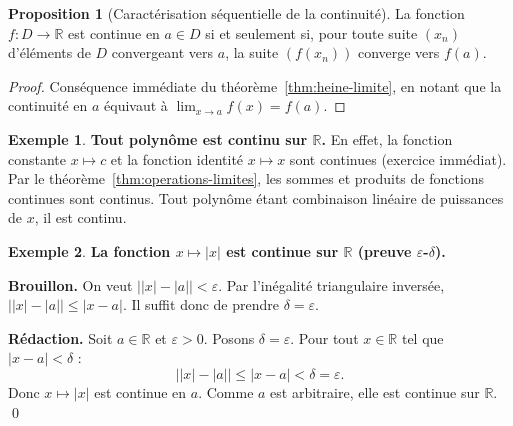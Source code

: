 \documentclass[12pt,a4paper,openany]{book}
\theoremstyle{definition}
\newtheorem{proposition}{Proposition}[chapter]
\newtheorem{exemple}{Exemple}[chapter]
\newcommand{\R}{\mathbb{R}}
\begin{document}
\begin{proposition}[Caractérisation séquentielle de la continuité]\label{prop:continuite-sequentielle}
La fonction $f \colon D \to \R$ est continue en $a \in D$ si et seulement si, pour toute suite $(x_n)$ d'éléments de $D$ convergeant vers $a$, la suite $(f(x_n))$ converge vers $f(a)$.
\end{proposition}

\begin{proof}
Conséquence immédiate du théorème~\ref{thm:heine-limite}, en notant que la continuité en $a$ équivaut à $\lim_{x \to a} f(x) = f(a)$.
\end{proof}

\begin{exemple}\label{ex:polynome-continu}
\textbf{Tout polynôme est continu sur $\R$.} En effet, la fonction constante $x \mapsto c$ et la fonction identité $x \mapsto x$ sont continues (exercice immédiat). Par le théorème~\ref{thm:operations-limites}, les sommes et produits de fonctions continues sont continus. Tout polynôme étant combinaison linéaire de puissances de $x$, il est continu.
\end{exemple}

\begin{exemple}\label{ex:valeur-absolue-continue}
\textbf{La fonction $x \mapsto |x|$ est continue sur $\R$ (preuve $\varepsilon$-$\delta$).}

\medskip
\textbf{Brouillon.} On veut $\bigl||x| - |a|\bigr| < \varepsilon$. Par l'inégalité triangulaire inversée, $\bigl||x| - |a|\bigr| \leqslant |x - a|$. Il suffit donc de prendre $\delta = \varepsilon$.

\medskip
\textbf{Rédaction.} Soit $a \in \R$ et $\varepsilon > 0$. Posons $\delta = \varepsilon$. Pour tout $x \in \R$ tel que $|x - a| < \delta$ :
\[
  \bigl||x| - |a|\bigr| \leqslant |x - a| < \delta = \varepsilon.
\]
Donc $x \mapsto |x|$ est continue en $a$. Comme $a$ est arbitraire, elle est continue sur $\R$. \qed
\end{exemple}
\end{document}
